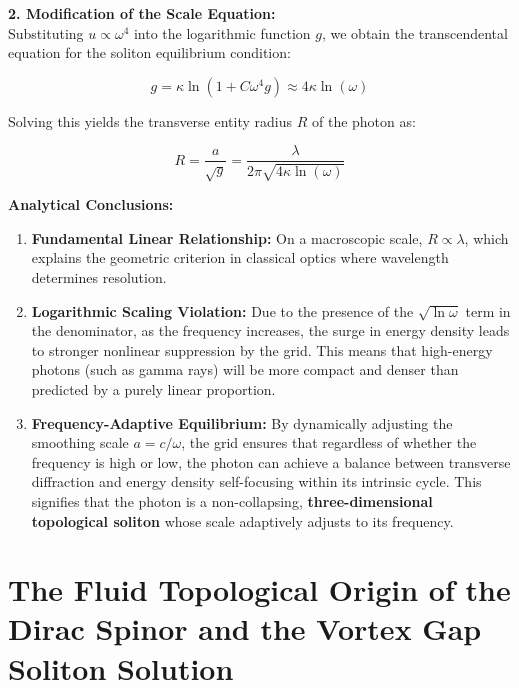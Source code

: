 \documentclass[12pt, a4paper]{article}
\begin{document}
\vspace{0.5em}
\noindent \textbf{2. Modification of the Scale Equation:} \\
Substituting $u \propto \omega^4$ into the logarithmic function $g$, we obtain the transcendental equation for the soliton equilibrium condition:

\begin{equation}
g = \kappa \ln(1 + C \omega^4 g) \approx 4\kappa \ln(\omega) 
\end{equation}

Solving this yields the transverse entity radius $R$ of the photon as:

\begin{equation}
R = \frac{a}{\sqrt{g}} = \frac{\lambda}{2\pi \sqrt{4\kappa \ln(\omega)}} 
\end{equation}

\vspace{0.5em}
\noindent \textbf{Analytical Conclusions:}

\begin{enumerate}
    \item \textbf{Fundamental Linear Relationship:} On a macroscopic scale, $R \propto \lambda$, which explains the geometric criterion in classical optics where wavelength determines resolution.
    \item \textbf{Logarithmic Scaling Violation:} Due to the presence of the $\sqrt{\ln \omega}$ term in the denominator, as the frequency increases, the surge in energy density leads to stronger nonlinear suppression by the grid. This means that high-energy photons (such as gamma rays) will be more compact and denser than predicted by a purely linear proportion.
    \item \textbf{Frequency-Adaptive Equilibrium:} By dynamically adjusting the smoothing scale $a=c/\omega$, the grid ensures that regardless of whether the frequency is high or low, the photon can achieve a balance between transverse diffraction and energy density self-focusing within its intrinsic cycle. This signifies that the photon is a non-collapsing, \textbf{three-dimensional topological soliton} whose scale adaptively adjusts to its frequency.
\end{enumerate}






\section{The Fluid Topological Origin of the Dirac Spinor and the Vortex Gap Soliton Solution}
\end{document}
